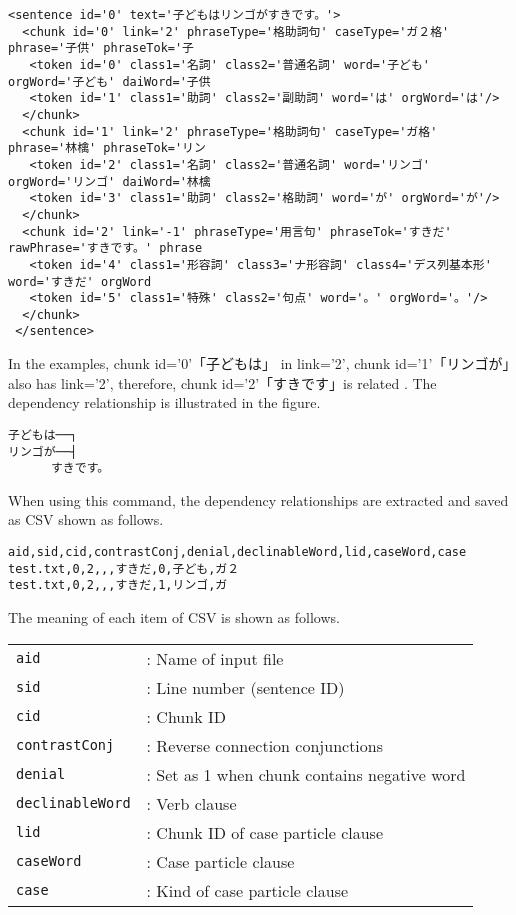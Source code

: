\begin{Verbatim}[baselinestretch=0.7,frame=single]
 <sentence id='0' text='子どもはリンゴがすきです。'>
  <chunk id='0' link='2' phraseType='格助詞句' caseType='ガ２格' phrase='子供' phraseTok='子
   <token id='0' class1='名詞' class2='普通名詞' word='子ども' orgWord='子ども' daiWord='子供
   <token id='1' class1='助詞' class2='副助詞' word='は' orgWord='は'/>
  </chunk>
  <chunk id='1' link='2' phraseType='格助詞句' caseType='ガ格' phrase='林檎' phraseTok='リン
   <token id='2' class1='名詞' class2='普通名詞' word='リンゴ' orgWord='リンゴ' daiWord='林檎
   <token id='3' class1='助詞' class2='格助詞' word='が' orgWord='が'/>
  </chunk>
  <chunk id='2' link='-1' phraseType='用言句' phraseTok='すきだ' rawPhrase='すきです。' phrase
   <token id='4' class1='形容詞' class3='ナ形容詞' class4='デス列基本形' word='すきだ' orgWord
   <token id='5' class1='特殊' class2='句点' word='。' orgWord='。'/>
  </chunk>
 </sentence>
\end{Verbatim}

In the examples,  
chunk id='0'「子どもは」 in link='2', 
chunk id='1'「リンゴが」also has link='2', 
therefore, chunk id='2'「すきです」is related . 
The dependency relationship is illustrated in the figure. 

\begin{Verbatim}[baselinestretch=0.7,frame=single]
子どもは──┐　
リンゴが──┤　
      すきです。
\end{Verbatim}

When using this command, the dependency relationships are extracted and saved as CSV shown as follows.  

\begin{Verbatim}[baselinestretch=0.7,frame=single]
aid,sid,cid,contrastConj,denial,declinableWord,lid,caseWord,case
test.txt,0,2,,,すきだ,0,子ども,ガ２
test.txt,0,2,,,すきだ,1,リンゴ,ガ
\end{Verbatim}

The meaning of each item of CSV is shown as follows. 

\begin{table}[htbp]
{\small
\begin{tabular}{ll}
\verb|aid|            & : Name of input file \\  
\verb|sid|            & : Line number (sentence ID)  \\  
\verb|cid|            & : Chunk ID \\  
\verb|contrastConj|   & : Reverse connection conjunctions  \\  
\verb|denial|         & : Set as 1 when chunk contains negative word  \\  
\verb|declinableWord| & : Verb clause \\  
\verb|lid|            & : Chunk ID of case particle clause  \\  
\verb|caseWord|       & : Case particle clause  \\  
\verb|case|           & : Kind of case particle clause   \\  
\end{tabular} 
}
\end{table} 

